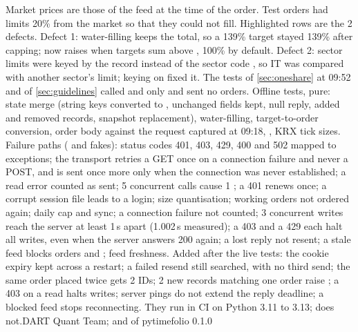 {{\begin{tabularx}{\linewidth}{>{\RaggedRight\arraybackslash}p{16mm} >{\RaggedRight\arraybackslash}p{25mm} >{\RaggedRight\arraybackslash}p{47mm} >{\RaggedRight\arraybackslash}X}
\end{tabularx}}}{Market prices are those of the feed at the time of the order. Test orders had limits 20\% from the market so that they could not fill. Highlighted rows are the 2 defects. Defect 1: water-filling keeps the total, so a 139\% target stayed 139\% after capping;  now raises  when targets sum above , 100\% by default. Defect 2: sector limits were keyed by the  record  instead of the sector code , so IT was compared with another sector's limit; keying on  fixed it. The tests of \ref{sec:oneshare} at 09:52 and of \ref{sec:guidelines} called  and  only and sent no orders. Offline tests, pure: state merge (string keys converted to , unchanged fields kept, null reply, added and removed records, snapshot replacement), water-filling, target-to-order conversion, order body against the request captured at 09:18, , KRX tick sizes. Failure paths ( and fakes): status codes 401, 403, 429, 400 and 502 mapped to exceptions; the transport retries a GET once on a connection failure and never a POST, and  is sent once more only when the connection was never established; a read error counted as sent; 5 concurrent  calls cause 1 ; a 401 renews once; a corrupt session file leads to a login; size quantisation; working orders not ordered again; daily cap and sync; a connection failure not counted; 3 concurrent writes reach the server at least 1\,s apart (1.002\,s measured); a 403 and a 429 each halt all writes, even when the server answers 200 again; a lost  reply not resent; a stale feed blocks orders and ; feed freshness. Added after the live tests: the cookie expiry kept across a restart; a failed resend still searched, with no third send; the same order placed twice gets 2 IDs; 2 new records matching one order raise ; a 403 on a read halts writes; server pings do not extend the reply deadline; a blocked feed stops reconnecting. They run in CI on Python 3.11 to 3.13;  does not.}{DART Quant Team;  and  of pytimefolio 0.1.0}
